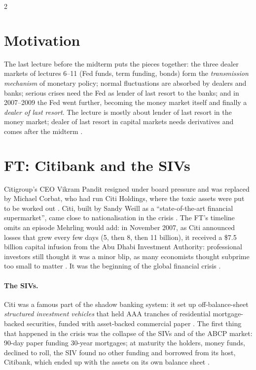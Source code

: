 \begin{paracol}{2}
\section*{Motivation}
The last lecture before the midterm puts the pieces together: the three dealer markets of lectures 6--11 (Fed funds, term funding, bonds) form the
\emph{transmission mechanism} of monetary policy; normal fluctuations are absorbed by dealers and banks; serious crises need the Fed as lender of last
resort to the banks; and in 2007--2009 the Fed went further, becoming the money market itself and finally a \emph{dealer of last resort}. The lecture is
mostly about lender of last resort in the money market; dealer of last resort in capital markets needs derivatives and comes after the midterm
.

\section{FT: Citibank and the SIVs}\label{sec:lr-ft}

\begin{casestudy}
Citigroup's CEO Vikram Pandit resigned under board pressure and was replaced by Michael Corbat, who had run Citi Holdings, where the toxic assets were put to
be worked out . Citi, built by Sandy Weill as a ``state-of-the-art financial supermarket'', came close to
nationalisation in the crisis . The FT's timeline omits an episode Mehrling would add: in November 2007, as Citi announced losses
that grew every few days (5, then 8, then 11 billion), it received a \$7.5 billion capital infusion from the Abu Dhabi Investment Authority: professional
investors still thought it was a minor blip, as many economists thought subprime too small to matter .
It was the beginning of the global financial crisis .
\end{casestudy}

\paragraph{The SIVs.} Citi was a famous part of the shadow banking system: it set up off-balance-sheet \emph{structured investment vehicles} that held AAA
tranches of residential mortgage-backed securities, funded with asset-backed commercial paper . The first thing that
happened in the crisis was the collapse of the SIVs and of the ABCP market: 90-day paper funding 30-year mortgages; at maturity the holders, money funds,
declined to roll, the SIV found no other funding and borrowed from its host, Citibank, which ended up with the assets on its own balance sheet
.


\end{paracol}
